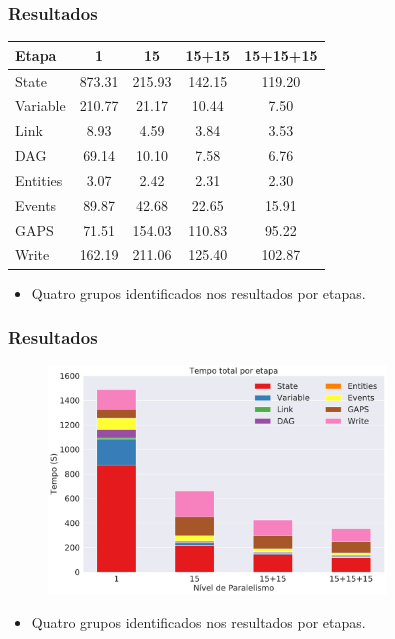 \documentclass{beamer}
\begin{document}
\begin{frame}
 \frametitle{Resultados}
  \begin{table}[ht]
  \begin{tabular}{l c c c c} \toprule
  \textbf{Etapa}  & \textbf{1} & \textbf{15} & \textbf{15+15} & 
  \textbf{15+15+15}\\ 
  \midrule
  State		& 873.31 & 215.93 & 142.15 & 119.20\\
  Variable  	& 210.77 & 21.17  & 10.44  & 7.50 \\
  Link      	& 8.93   & 4.59   & 3.84   & 3.53 \\
  DAG        	& 69.14  & 10.10  & 7.58   & 6.76 \\
  Entities	& 3.07   & 2.42   & 2.31   & 2.30 \\
  Events		& 89.87  & 42.68  & 22.65  & 15.91\\
  GAPS		& 71.51  & 154.03 & 110.83 & 95.22\\
  Write		& 162.19 & 211.06 & 125.40 & 102.87\\
  \end{tabular}
  \end{table}
  \begin{itemize}
   \item Quatro grupos identificados nos resultados por etapas.
  \end{itemize}
\end{frame}

\begin{frame}
 \frametitle{Resultados}
  \begin{figure}[ht]
  \centerline{
  \includegraphics[width=0.8\textwidth]{./img/total_step.pdf}}
  \end{figure}
  \begin{itemize}
   \item Quatro grupos identificados nos resultados por etapas.
  \end{itemize}
\end{frame}
\end{document}
